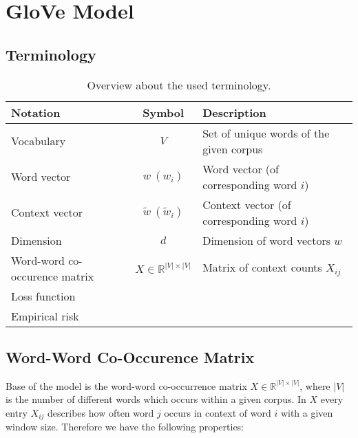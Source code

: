 \chapter{GloVe Model}\label{ch:glove}

\section{Terminology}

\begin{table}[!ht]
  \begin{center}      
      \begin{tabular}{l|c|m{6cm}}
          \hline
          \textbf{Notation} & \textbf{Symbol} & \parbox{6cm}{\centering\textbf{Description}} \\
          \hline\hline
          Vocabulary & $V$ & Set of unique words of the given corpus\\ \hline
          Word vector & $w\ (w_i)$ & Word vector (of corresponding word $i$)\\ \hline
          Context vector & $\tilde{w}\ (\tilde{w}_i)$ & Context vector (of corresponding word $i$)\\ \hline
          Dimension   & $d$ & Dimension of word vectors $w$\\ \hline
          Word-word co-occurence matrix & $X \in \mathbb{R}^{|V| \times |V|}$ & Matrix of context counts $X_{ij}$\\ \hline
          Loss function & & \\ \hline
          Empirical risk & & \\ \hline
      \end{tabular}
  \end{center}
\caption{Overview about the used terminology.}
\label{tab:terminology}
\end{table}

\section{Word-Word Co-Occurence Matrix}

Base of the model is the word-word co-occurrence matrix 
$X \in \mathbb{R}^{|V| \times |V|}$, where $|V|$ is the number of different 
words which occurs within a given corpus. In $X$ every entry
$X_{ij}$ describes how often word $j$ occurs in context of word $i$ with a given
window size. Therefore we have the following properties:

